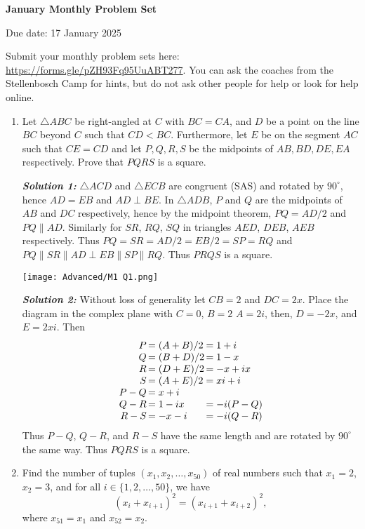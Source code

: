 \documentclass[12pt]{article}
\newcommand{\solnum}[1]{\textbf{\textit{Solution #1: }}}
\begin{document}
\begin{center} \bfseries \large
    January Monthly Problem Set

    Due date: 17 January 2025
\end{center}

\bigskip
Submit your monthly problem sets here: \url{https://forms.gle/pZH93Fq95UuABT277}.
You can ask the coaches from the Stellenbosch Camp for hints, but do not ask other people for help or look for help online.

\begin{enumerate}[topsep=\bigskipamount,itemsep=\bigskipamount,leftmargin=0pt]
\item %
Let $\triangle{ABC}$ be right-angled at $C$ with $BC= CA$, and $D$ be a point on the line $BC$ beyond $C$ such that $CD < BC$.
Furthermore, let $E$ be on the segment $AC$ such that $CE=CD$ and let $P, Q, R, S$ be the midpoints of $AB, BD, DE, EA$ respectively.
Prove that $PQRS$ is a square.

\solnum{1}
$\triangle ACD$ and $\triangle ECB$ are congruent (SAS) and rotated by $90^\circ$,
hence $AD=EB$ and $AD\perp BE$.
In $\triangle ADB$, $P$ and $Q$ are the midpoints of $AB$ and $DC$ respectively,
hence by the midpoint theorem,
$PQ=AD/2$ and $PQ\parallel AD$.
Similarly for $SR$, $RQ$, $SQ$ in triangles
$AED$, $DEB$, $AEB$ respectively.
Thus $PQ=SR=AD/2=EB/2=SP=RQ$
and $PQ\parallel SR\parallel AD\perp EB\parallel SP\parallel RQ$.
Thus $PRQS$ is a square.

\texttt{[image: Advanced/M1 Q1.png]}

\solnum{2}
Without loss of generality let $CB = 2$ and $DC = 2x$.
Place the diagram in the complex plane 
with $C=0$, $B=2$ $A = 2i$, then, $D = -2x$, and $E=2xi$.
Then 
$$\begin{array}{r@{\,}l@{\,}l}
    P &= (A+B)/2 & = 1+i\\
    Q &= (B+D)/2 & = 1-x\\
    R &= (D+E)/2 & = -x+ix\\
    S &= (A+E)/2 & = xi+i\\
    P-Q & = x+i &\\
    Q-R & = 1-ix & = -i(P-Q)\\
    R-S & = -x-i & = -i(Q-R)
\end{array}$$
Thus $P-Q$, $Q-R$, and $R-S$ have the same length and are rotated by $90^\circ$ the same way.
Thus $PQRS$ is a square.

\item Find the number of tuples $(x_1, x_2, \dots, x_{50})$ of real numbers such that $x_1 = 2$, $x_2 = 3$, and for all $i\in \{1,2,\dots,50\}$, we have
$$(x_i+x_{i+1})^2 = (x_{i+1} + x_{i+2})^2,$$
where $x_{51} = x_{1}$ and $x_{52} = x_{2}$.


\end{enumerate}
\end{document}
